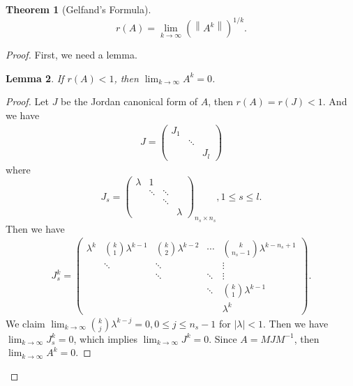 \documentclass[11pt]{book}
\newtheorem{theorem}{Theorem}[section]
\newtheorem{lemma}[theorem]{Lemma}
\theoremstyle{definition}
\numberwithin{equation}{chapter}
\begin{document}
\begin{theorem}[Gelfand's Formula]\label{Gelfand_Formula}
$$r(A) = \lim_{k\to\infty} \left(\left\|A^k\right\|\right)^{1/k}. $$
\end{theorem}
\begin{proof}
First, we need a lemma.
\begin{lemma}\label{Gelfand_Formula_lemma}
If $r(A) < 1$, then $\lim_{k\to\infty}A^k = 0$.
\end{lemma}
\begin{proof}
Let $J$ be the Jordan canonical form of $A$, then $r(A) = r(J) < 1$. And we have 
\begin{align*}
    J =  \begin{pmatrix}
    J_1 &  &  \\
     & \ddots  &  \\
     &   & J_l
    \end{pmatrix}
\end{align*}
where $$J_s = \left(\begin{smallmatrix}
    \lambda & 1 &  & \\
     & \ddots  & \ddots & \\
     &   & \ddots &  \\
     &   &   & \lambda
\end{smallmatrix}\right)_{n_s\times n_s}, 1\leq s\leq l.$$
Then we have 
\begin{align*}
    J_s^k = \begin{pmatrix}
    \lambda^k & \binom{k}{1}\lambda^{k-1} & \binom{k}{2}\lambda^{k-2} & \cdots & \binom{k}{n_s-1} \lambda^{k - n_s +1} \\
     & \ddots  & \ddots &  & \vdots \\
     &         & \ddots &  \ddots & \vdots \\
     &         &        &  \ddots & \binom{k}{1}\lambda^{k-1} \\
     &         &        &         & \lambda^k
    \end{pmatrix}.
\end{align*}
We claim $\lim_{k\to\infty}\binom{k}{j}\lambda^{k-j} = 0, 0\leq j\leq n_s-1$ for $|\lambda| < 1$. Then we have $\lim_{k\to\infty} J_s^k = 0$, which implies $\lim_{k\to\infty} J^k = 0$. Since $A = MJM^{-1}$, then $\lim_{k\to\infty} A^k = 0$.
\end{proof}


\end{proof}
\end{document}
